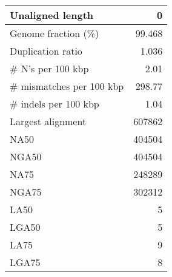\documentclass[12pt,a4paper]{article}
\begin{document}
\begin{table}[ht]
\begin{center}
\begin{tabular}{|l*{1}{|r}|}
Unaligned length & 0 \\ \hline
Genome fraction (\%) & 99.468 \\ \hline
Duplication ratio & 1.036 \\ \hline
\# N's per 100 kbp & 2.01 \\ \hline
\# mismatches per 100 kbp & 298.77 \\ \hline
\# indels per 100 kbp & 1.04 \\ \hline
Largest alignment & 607862 \\ \hline
NA50 & 404504 \\ \hline
NGA50 & 404504 \\ \hline
NA75 & 248289 \\ \hline
NGA75 & 302312 \\ \hline
LA50 & 5 \\ \hline
LGA50 & 5 \\ \hline
LA75 & 9 \\ \hline
LGA75 & 8 \\ \hline
\end{tabular}
\end{center}
\end{table}
\end{document}
